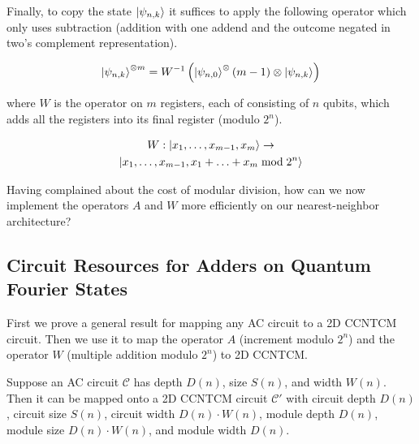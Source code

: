 Finally, to copy the state $\left\vert{\psi_{n,k}}\right\rangle$ it suffices to apply the following
operator which only uses subtraction (addition with one addend and the
outcome negated in two's complement representation).

\begin{equation*}
\left\vert{\psi_{n,k}}\right\rangle^{\otimes m} = W^{-1}\left( \left\vert{\psi_{n,0}}\right\rangle^\otimes(m-1) \otimes \left\vert{\psi_{n,k}}\right\rangle \right)
\end{equation*}

where $W$ is the operator on $m$ registers, each of consisting of $n$ qubits,
which adds all the registers into its final register (modulo $2^n$).

\begin{multline}
W : \left\vert{x_1,\ldots,x_{m-1},x_m}\right\rangle \rightarrow \\
 \left\vert{x_1,\ldots,x_{m-1},x_1+\ldots+x_m \bmod 2^n}\right\rangle
\end{multline}

Having complained about the cost of modular division, how can we now
implement the operators $A$ and $W$ more efficiently on our
nearest-neighbor architecture?

\subsection{Circuit Resources for Adders on Quantum Fourier States}
\label{subsec:qfs-adder}

First we prove a general result for mapping any \textsf{AC} circuit
to a \textsf{2D CCNTCM} circuit.
Then we use it to 
map the operator $A$ (increment modulo $2^n$) and the operator
$W$ (multiple addition modulo $2^n$) to \textsf{2D CCNTCM}.

\begin{lemma}
Suppose an \textsf{AC} circuit $\mathcal{C}$ has
depth $D(n)$, size $S(n)$, and width $W(n)$. Then it can be mapped
onto a \textsf{2D CCNTCM} circuit $\mathcal{C'}$ with circuit depth
$D(n)$, circuit size $S(n)$, circuit width $D(n)\cdot W(n)$,
module depth $D(n)$, module size $D(n)\cdot W(n)$, and module width
$D(n)$.
\label{lem:ac-ccntcm}
\end{lemma}

